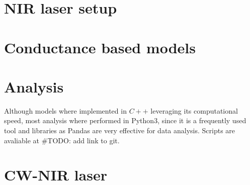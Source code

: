 \section{NIR laser setup}
\section{Conductance based models}
\section{Analysis}
Although models where implemented in $C++$ leveraging its computational speed, most analysis where performed in Python3, since it is a frequently used tool and libraries as Pandas are very effective for data analysis. 
Scripts are avaliable at \#TODO: add link to git. 

\section{CW-NIR laser}
%